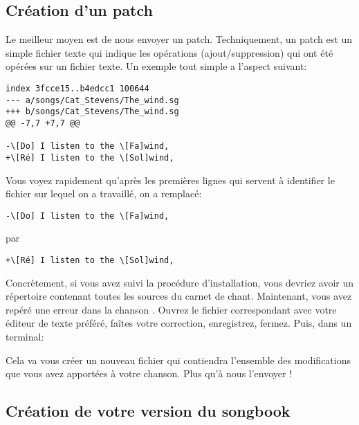 \documentclass[versionenligne]{patacrep}
\begin{document}
\subsection{Création d'un patch}

Le meilleur moyen est de nous envoyer un patch. Techniquement, un
patch est un simple fichier texte qui indique les opérations
(ajout/suppression) qui ont été opérées sur un fichier texte. Un
exemple tout simple a l'aspect suivant:

\begin{verbatim}
index 3fcce15..b4edcc1 100644
--- a/songs/Cat_Stevens/The_wind.sg
+++ b/songs/Cat_Stevens/The_wind.sg
@@ -7,7 +7,7 @@

-\[Do] I listen to the \[Fa]wind,
+\[Ré] I listen to the \[Sol]wind,
\end{verbatim}

Vous voyez rapidement qu'après les premières lignes qui servent à
identifier le fichier sur lequel on a travaillé, on a remplacé:
\begin{verbatim}
-\[Do] I listen to the \[Fa]wind,
\end{verbatim}
par
\begin{verbatim}
+\[Ré] I listen to the \[Sol]wind,
\end{verbatim}

Concrètement, si vous avez suivi la procédure d'installation,
vous devriez avoir un répertoire  contenant toutes les
sources du carnet de chant. Maintenant, vous avez repéré une erreur
dans la chanson . Ouvrez le fichier
correspondant avec votre éditeur de texte préféré, faîtes votre
correction, enregistrez, fermez. Puis, dans un terminal:


Cela va vous créer un nouveau fichier  qui contiendra
l'ensemble des modifications que vous avez apportées à votre
chanson. Plus qu'à nous l'envoyer !

\subsection{Création de votre version du songbook}
\end{document}

